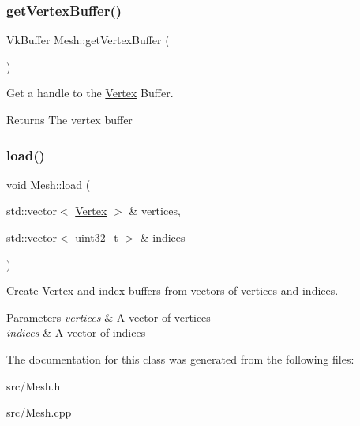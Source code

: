 \subsubsection{\texorpdfstring{getVertexBuffer()}{getVertexBuffer()}}
{\footnotesize\ttfamily Vk\+Buffer Mesh\+::get\+Vertex\+Buffer (\begin{DoxyParamCaption}{ }\end{DoxyParamCaption})}



Get a handle to the \mbox{\hyperlink{struct_vertex}{Vertex}} Buffer. 

\begin{DoxyReturn}{Returns}
The vertex buffer 
\end{DoxyReturn}
\mbox{\label{class_mesh_a5cfd919c6ee3b1533fa977a671e9d8ef}} 
\subsubsection{\texorpdfstring{load()}{load()}}
{\footnotesize\ttfamily void Mesh\+::load (\begin{DoxyParamCaption}\item[{std\+::vector$<$ \mbox{\hyperlink{struct_vertex}{Vertex}} $>$ \&}]{vertices,  }\item[{std\+::vector$<$ uint32\+\_\+t $>$ \&}]{indices }\end{DoxyParamCaption})}



Create \mbox{\hyperlink{struct_vertex}{Vertex}} and index buffers from vectors of vertices and indices. 


\begin{DoxyParams}{Parameters}
{\em vertices} & A vector of vertices \\
\hline
{\em indices} & A vector of indices \\
\hline
\end{DoxyParams}


The documentation for this class was generated from the following files\+:\begin{DoxyCompactItemize}
\item 
src/Mesh.\+h\item 
src/Mesh.\+cpp\end{DoxyCompactItemize}
